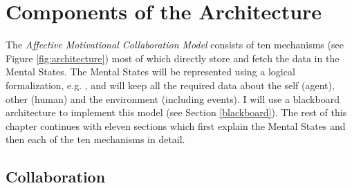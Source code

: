\documentclass[12pt]{report}
\begin{document}
\section{Components of the Architecture}
\label{sec:architecture-components}

The \textit{Affective Motivational Collaboration Model} consists of ten
mechanisms (see Figure \ref{fig:architecture}) most of which directly store and
fetch the data in the Mental States. The Mental States will be represented using
a logical formalization, e.g. \cite{adam:logical-formalization}, and will keep
all the required data about the self (agent), other (human) and the environment
(including events). I will use a blackboard \cite{erman:hearsay-blackboard}
architecture to implement this model (see Section \ref{blackboard}). The rest of
this chapter continues with eleven sections which first explain the Mental
States and then each of the ten mechanisms in detail.

\subsection{Collaboration}
\end{document}
